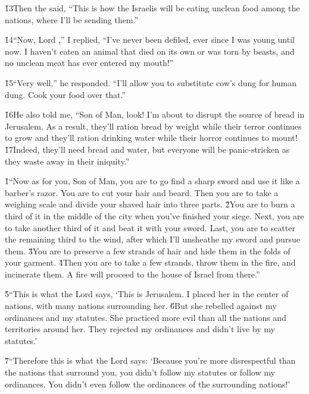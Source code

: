 \v{13}Then the  said, ``This is how the Israelis will be eating unclean food among the nations, where I'll be sending them.''

\v{14}``Now, Lord ,'' I replied, ``I've never been defiled, ever since I was young until now. I haven't eaten an animal that died on its own or was torn by beasts, and no unclean meat has ever entered my mouth!''

\v{15}``Very well,'' he responded. ``I'll allow you to substitute cow's dung for human dung. Cook your food over that.''

\v{16}He also told me, ``Son of Man, look! I'm about to disrupt the source of bread in Jerusalem. As a result, they'll ration bread by weight while their terror continues to grow and they'll ration drinking water while their horror continues to mount! \v{17}Indeed, they'll need bread and water, but everyone will be panic-stricken as they waste away in their iniquity.''

\v{1}``Now as for you, Son of Man, you are to go find a sharp sword and use it like a barber's razor. You are to cut your hair and beard. Then you are to take a weighing scale and divide your shaved hair into three parts. \v{2}You are to burn a third of it in the middle of the city when you've finished your siege. Next, you are to take another third of it and beat it with your sword. Last, you are to scatter the remaining third to the wind, after which I'll unsheathe my sword and pursue them. \v{3}You are to preserve a few strands of hair and hide them in the folds of your garment. \v{4}Then you are to take a few strands, throw them in the fire, and incinerate them. A fire will proceed to the house of Israel from there.''

\v{5}``This is what the Lord  says, `This is Jerusalem. I placed her in the center of nations, with many nations surrounding her. \v{6}But she rebelled against my ordinances and my statutes. She practiced more evil than all the nations and territories around her. They rejected my ordinances and didn't live by my statutes.'

\v{7}``Therefore this is what the Lord  says: `Because you're more disrespectful than the nations that surround you, you didn't follow my statutes or follow my ordinances. You didn't even follow the ordinances of the surrounding nations!'

